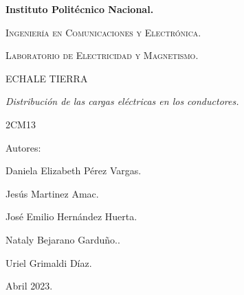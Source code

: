 \documentclass[spanish,10pt,a4paper,onecolumn]{article}
\begin{document}
\pagestyle{fancy}
\cfoot{}


\lhead{}

\begin{titlepage}

	\begin{figure}[t]
		\hspace{0.6\textwidth}
	\end{figure}

	\centering
	{\bfseries\Huge Instituto Politécnico Nacional. \par}
	\vspace{1cm}
	{\scshape\Large Ingeniería en Comunicaciones y Electrónica. \par}
	\vspace{0.3cm}
	{\scshape\Large Laboratorio de Electricidad y Magnetismo.  \par}
	\vspace{1cm}
	{\scshape\Huge ECHALE TIERRA \par}
	\vspace{1cm}
	{\itshape\Large Distribución de las cargas eléctricas en los conductores. \par}
	{\Large 2CM13\par}
	\vfill
	{\Large Autores: \par}
	{\Large Daniela Elizabeth Pérez Vargas. \par}
	{\Large Jesús Martinez Amac. \par}
	{\Large José Emilio Hernández Huerta. \par}
	{\Large Nataly Bejarano Garduño..\par}
	{\Large Uriel Grimaldi Díaz.  \par}
	\vfill
	{\Large Abril 2023. \par}

\end{titlepage}
\end{document}
